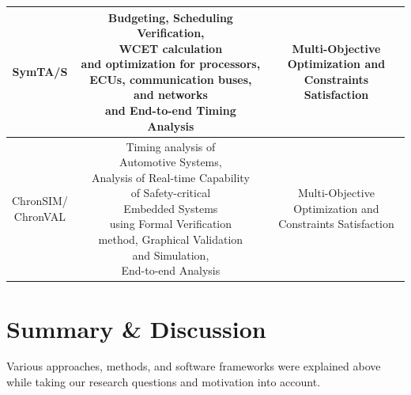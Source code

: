 \begin{longtable}{@{}>{\footnotesize}c >{\footnotesize}c >{\footnotesize}c@{}}
SymTA/S &  \makecell{Budgeting, Scheduling Verification,\\ WCET calculation\\ and optimization for processors,\\ ECUs, communication buses,\\ and networks \\ and End-to-end Timing\\ Analysis } &\makecell{Multi-Objective\\ Optimization and \\Constraints Satisfaction} \\ \midrule
\makecell{ChronSIM/\\ChronVAL} & \makecell{Timing analysis of\\ Automotive Systems,\\ Analysis of Real-time Capability\\ of Safety-critical\\ Embedded Systems\\ using Formal Verification\\ method, Graphical Validation\\ and Simulation,\\ End-to-end Analysis \\}  & \makecell{Multi-Objective\\ Optimization and \\Constraints Satisfaction}\\
\bottomrule
\end{longtable}



\section{Summary \& Discussion}\label{summary_relatedwork}
Various approaches, methods, and software frameworks were explained above while taking our research questions and motivation into account.



